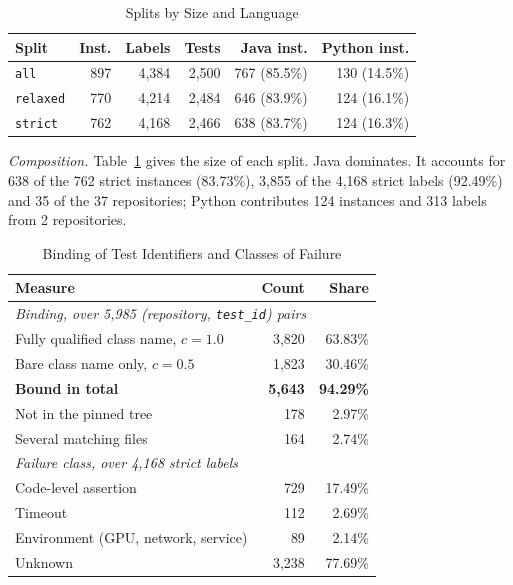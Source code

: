 \documentclass[10pt,conference]{IEEEtran}
\begin{document}
\begin{table}[t]
\caption{Splits by Size and Language}
\label{tab:splits}
\centering
\scriptsize
\setlength{\tabcolsep}{3pt}
\renewcommand{\arraystretch}{0.90}
\begin{tabular}{@{}lrrrrr@{}}
\toprule
\textbf{Split} & \textbf{Inst.} & \textbf{Labels} & \textbf{Tests} & \textbf{Java inst.} & \textbf{Python inst.} \\
\midrule
\texttt{all} & 897 & 4,384 & 2,500 & 767 (85.5\%) & 130 (14.5\%) \\
\texttt{relaxed} & 770 & 4,214 & 2,484 & 646 (83.9\%) & 124 (16.1\%) \\
\texttt{strict} & 762 & 4,168 & 2,466 & 638 (83.7\%) & 124 (16.3\%) \\
\bottomrule
\end{tabular}
\end{table}

\textit{Composition.} Table~\ref{tab:splits} gives the size of each split. Java dominates. It accounts for 638 of the 762 strict instances (83.73\%), 3,855 of the 4,168 strict labels (92.49\%) and 35 of the 37 repositories; Python contributes 124 instances and 313 labels from 2 repositories.

\begin{table}[t]
\caption{Binding of Test Identifiers and Classes of Failure}
\label{tab:quality}
\centering
\scriptsize
\setlength{\tabcolsep}{3pt}
\renewcommand{\arraystretch}{0.90}
\begin{tabular}{@{}lrr@{}}
\toprule
\textbf{Measure} & \textbf{Count} & \textbf{Share} \\
\midrule
\multicolumn{3}{l}{\textit{Binding, over 5,985 (repository, \texttt{test\_id}) pairs}} \\
Fully qualified class name, $c=1.0$ & 3,820 & 63.83\% \\
Bare class name only, $c=0.5$ & 1,823 & 30.46\% \\
\textbf{Bound in total} & \textbf{5,643} & \textbf{94.29\%} \\
Not in the pinned tree & 178 & 2.97\% \\
Several matching files & 164 & 2.74\% \\
\midrule
\multicolumn{3}{l}{\textit{Failure class, over 4,168 strict labels}} \\
Code-level assertion & 729 & 17.49\% \\
Timeout & 112 & 2.69\% \\
Environment (GPU, network, service) & 89 & 2.14\% \\
Unknown & 3,238 & 77.69\% \\
\bottomrule
\end{tabular}
\end{table}
\end{document}
